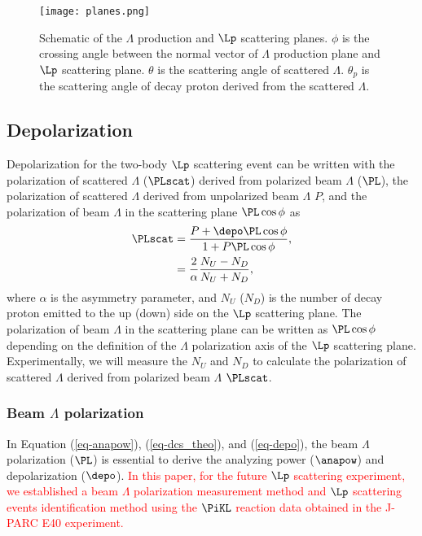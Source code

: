 \begin{figure}[h!]
 \begin{center}
   \texttt{[image: planes.png]}
   \caption{Schematic of the $\Lambda$ production and $\Lp$ scattering planes. $\phi$ is the crossing angle between the normal vector of $\Lambda$ production plane and $\Lp$ scattering plane. $\theta$ is the scattering angle of scattered $\Lambda$. $\theta_{p}$ is the scattering angle of decay proton derived from the scattered $\Lambda$.}
   \label{fig-planes}
 \end{center}
\end{figure}

\subsection{Depolarization}
\label{sec-depo}

Depolarization for the two-body $\Lp$ scattering event can be written with the polarization of scattered $\Lambda$ ($\PLscat$) derived from polarized beam $\Lambda$ ($\PL$), the polarization of scattered $\Lambda$ derived from unpolarized beam $\Lambda$ $P$, and the polarization of beam $\Lambda$ in the scattering plane $\PL\cos{\phi}$ as
\begin{align}
  \PLscat &= \frac{P+\depo\PL\cos{\phi}}{1+P\PL\cos{\phi}}, \\
  &= \frac{2}{\alpha} \frac{N_{U}-N_{D}}{N_{U}+N_{D}},
  \label{eq-depo}
\end{align}
where $\alpha$ is the asymmetry parameter, and $N_{U}$ ($N_{D}$) is the number of decay proton emitted to the up (down) side on the $\Lp$ scattering plane. The polarization of beam $\Lambda$ in the scattering plane can be written as $\PL\cos{\phi}$ depending on the definition of the $\Lambda$ polarization axis of the $\Lp$ scattering plane. Experimentally, we will measure the $N_{U}$ and $N_{D}$ to calculate the polarization of scattered $\Lambda$ derived from polarized beam $\Lambda$ $\PLscat$. 

\subsubsection{Beam $\Lambda$ polarization}
In Equation (\ref{eq-anapow}), (\ref{eq-dcs_theo}), and (\ref{eq-depo}), the beam $\Lambda$ polarization ($\PL$) is essential to derive the analyzing power ($\anapow$) and depolarization ($\depo$). \textcolor{red}{In this paper, for the future $\Lp$ scattering experiment, we established a beam $\Lambda$ polarization measurement method and $\Lp$ scattering events identification method using the $\PiKL$ reaction data obtained in the J-PARC E40 experiment.}


